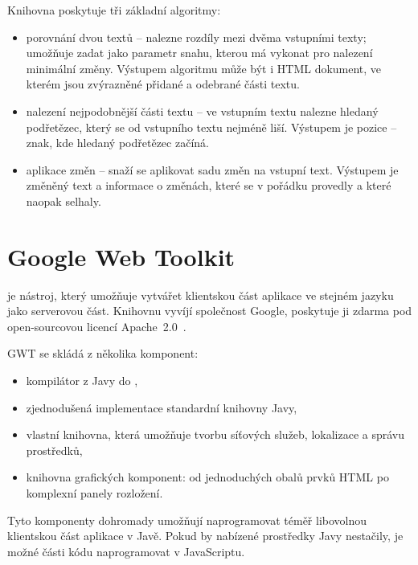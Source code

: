 Knihovna poskytuje tři základní algoritmy:
\begin{itemize}
	\item porovnání dvou textů -- nalezne rozdíly mezi dvěma vstupními texty; umožňuje zadat jako parametr snahu, kterou má vykonat pro nalezení minimální změny.
		Výstupem algoritmu může být i HTML dokument, ve kterém jsou zvýrazněné přidané a odebrané části textu.
	\item nalezení nejpodobnější části textu -- ve vstupním textu nalezne hledaný podřetězec, který se od vstupního textu nejméně liší.
		Výstupem je pozice -- znak, kde hledaný podřetězec začíná.
	\item aplikace změn -- snaží se aplikovat sadu změn na vstupní text.
		Výstupem je změněný text a informace o změnách, které se v pořádku provedly a které naopak selhaly.
\end{itemize}

\section{Google Web Toolkit}

 je nástroj, který umožňuje vytvářet klientskou část aplikace ve stejném jazyku jako serverovou část.
Knihovnu vyvíjí společnost Google, poskytuje ji zdarma pod open-sourcovou licencí Apache~2.0~\cite{apache20}.

GWT se skládá z několika komponent:
\begin{itemize}
	\item kompilátor z Javy do ,
	\item zjednodušená implementace standardní knihovny Javy,
	\item vlastní knihovna, která umožňuje tvorbu síťových služeb, lokalizace a správu prostředků,
	\item knihovna grafických komponent: od jednoduchých obalů prvků HTML po komplexní panely rozložení.
\end{itemize}

Tyto komponenty dohromady umožňují naprogramovat téměř libovolnou klientskou část aplikace v Javě.
Pokud by nabízené prostředky Javy nestačily, je možné části kódu naprogramovat v JavaScriptu.


